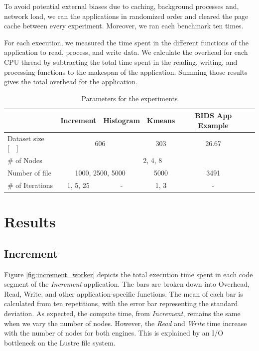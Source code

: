 \documentclass[AMA,STIX1COL]{WileyNJD-v2}
\begin{document}
To avoid potential external biases due to caching, background processes and,
network load, we ran the applications in randomized order and cleared the
page cache between every experiment.
Moreover, we ran each benchmark ten times.
						
For each execution, we measured the time spent in the different functions of the
application to read, process, and write data.
We calculate the overhead for each CPU thread by subtracting the total time
spent in the reading, writing, and processing functions to the makespan of the application.
Summing those results gives the total overhead for the application.
						
\begin{table}[t]
	\renewcommand{\arraystretch}{1.5}
	\caption{Parameters for the experiments}\label{table:parameters}
	\centering
	\begin{tabular}{|l|c|c|c|c|c|}
		\hline           & Increment & Histogram & Kmeans & BIDS App Example \\\hline
		Dataset size [\SI{}{\gibi\byte}] &\multicolumn{2}{c|}{606} & 303 & \multicolumn{1}{c|}{26.67} \\\hline
		\# of Nodes & \multicolumn{4}{c|}{2, 4, 8} \\\hline
		Number of file & \multicolumn{2}{c|}{1000, 2500, 5000} & 5000 & \multicolumn{1}{c|}{3491} \\\hline
		\# of Iterations & 1, 5, 25  & -         & 1, 3   & -                \\\hline
	\end{tabular}
\end{table}
						
\section{Results}
\subsection{Increment}
Figure \ref{fig:increment_worker} depicts the total execution time spent in each code segment of the \textit{Increment} application.
The bars are broken down into Overhead, Read, Write, and other application-specific functions.
The mean of each bar is calculated from ten repetitions, with the error bar representing the standard deviation.
As expected, the compute time, from \textit{Increment}, remains the same when we vary the number of nodes.
However, the \textit{Read} and \textit{Write} time increase with the number of nodes for both engines.
This is explained by an I/O bottleneck on the Lustre file system.
						
\end{document}
